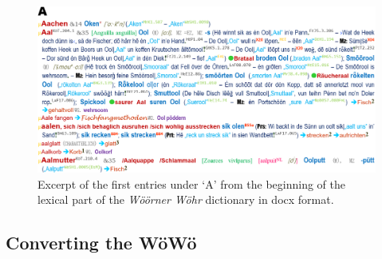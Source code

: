     
\begin{figure}
    \centering
    \includegraphics[width=0.95\linewidth]{img/woewoe_excerpt-hires.png}
    \caption{Excerpt of the first entries under ‘A’ from the beginning of the lexical part of the \emph{Wöörner Wöhr} dictionary in docx format.}
    \label{fig-woewoe-excerpt}
\end{figure}

\subsection{Converting the WöWö}

